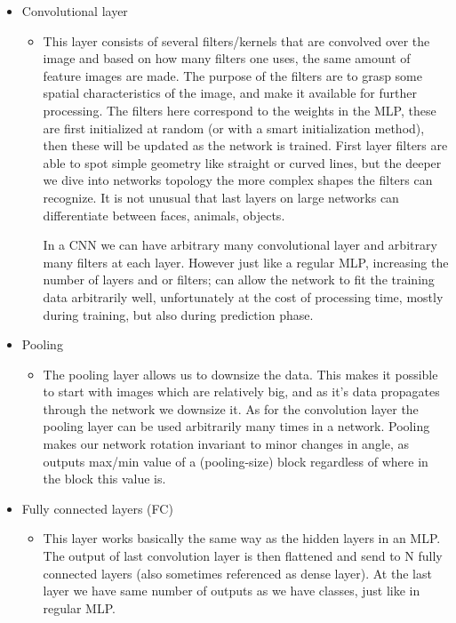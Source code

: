 \documentclass[Report.tex]{subfiles}
\begin{document}
\begin{flushleft}
    \begin{itemize}
        \item{Convolutional layer}
        \begin{itemize}
            \item{This layer consists of several filters/kernels that are convolved over the image and based on how many filters one uses, the same amount of feature images are made. The purpose of the filters are to grasp some spatial characteristics of the image, and make it available for further processing.
            The filters here correspond to the weights in the MLP, these are first initialized at random (or with a smart initialization method), then these will be updated as the network is trained.
            First layer filters are able to spot simple geometry like straight or curved lines, but the deeper we dive into networks topology the more complex shapes the filters can recognize. It is not unusual that last layers on large networks can differentiate between faces, animals, objects.\par
            In a CNN we can have arbitrary many convolutional layer and arbitrary many filters at each layer. However just like a regular MLP, increasing the number of layers and or filters; can allow the network to fit the training data arbitrarily well, unfortunately at the cost of processing time, mostly during training, but also during prediction phase.}
            \end{itemize}
        \item{Pooling}
        \begin{itemize}
            \item{The pooling layer allows us to downsize the data. This makes it possible to start with images which are relatively big, and as it's data propagates through the network we downsize it. As for the convolution layer the pooling layer can be used arbitrarily many times in a network.
            Pooling makes our network rotation invariant to minor changes in angle, as outputs max/min value of a (pooling-size) block regardless of where in the block this value is.}
        \end{itemize}
        \item{Fully connected layers (FC)}
        \begin{itemize}
            \item{This layer works basically the same way as the hidden layers in an MLP.
            The output of last convolution layer is then flattened and send to N fully connected layers (also sometimes referenced as dense layer). At the last layer we have same number of outputs as we have classes, just like in regular MLP.}
            \end{itemize}
        \end{itemize}
    \end{flushleft}
\end{document}
